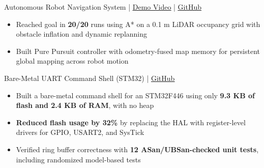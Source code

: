\documentclass[11pt]{article}       %
\newcommand{\textsb}[1]{{\fontseries{sb}\selectfont #1}}
\begin{document}
\vspace{6pt}

\textsb{Autonomous Robot Navigation System} | \href{https://youtu.be/CKogSlk9C5I}{\underline{Demo Video}} | \href{autohttps://github.com/LegendaryArk/wato_asd_training}{\underline{GitHub}}
\begin{itemize}
    \item Reached goal in \textbf{20/20} runs using A* on a 0.1 m LiDAR occupancy grid with obstacle inflation and dynamic replanning
    \item Built Pure Pursuit controller with odometry-fused map memory for persistent global mapping across robot motion
\end{itemize}

\vspace{6pt}

\textsb{Bare-Metal UART Command Shell (STM32)} | \href{https://github.com/LegendaryArk/terminal-controlled-stm}{\underline{GitHub}}
\begin{itemize}
    \item Built a bare-metal command shell for an STM32F446 using only \textbf{9.3 KB of flash and 2.4 KB of RAM}, with no heap
    \item \textbf{Reduced flash usage by 32\%} by replacing the HAL with register-level drivers for GPIO, USART2, and SysTick
    \item Verified ring buffer correctness with \textbf{12 ASan/UBSan-checked unit tests}, including randomized model-based tests
\end{itemize}



\end{document}
